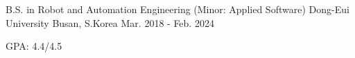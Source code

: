 \begin{cventries}
    \cventry
    {B.S. in Robot and Automation Engineering (Minor: Applied Software)} %
    {{Dong-Eui University}
    } %
    {Busan, S.Korea} %
    {Mar. 2018 - Feb. 2024} %
    {
      \begin{cvitems} %
      \item{GPA: 4.4/4.5}
      \end{cvitems}
    }


\end{cventries}
